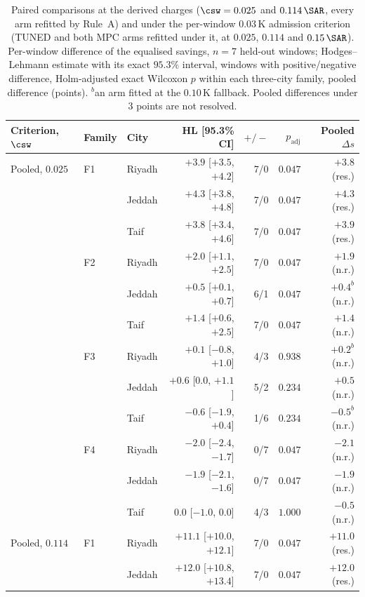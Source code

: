 \begin{table}[!ht]
\centering
\caption{Paired comparisons at the derived charges ($\csw=0.025$ and $0.114\,\SAR$, every arm refitted by Rule~A) and under the per-window $0.03\,$K admission criterion (TUNED and both MPC arms refitted under it, at $0.025$, $0.114$ and $0.15\,\SAR$). Per-window difference of the equalised savings, $n=7$ held-out windows; Hodges--Lehmann estimate with its exact $95.3\%$ interval, windows with positive/negative difference, Holm-adjusted exact Wilcoxon $p$ within each three-city family, pooled difference (points). $^{b}$an arm fitted at the $0.10\,$K fallback. Pooled differences under $3$ points are not resolved.}
\label{tab:s-derived}
\scriptsize
\setlength{\tabcolsep}{3pt}
\begin{tabularx}{\textwidth}{@{}llXrrrr@{}}
\toprule
Criterion, $\csw$ & Family & City & HL [95.3\% CI] & $+/-$ & $p_{\mathrm{adj}}$ & Pooled $\Delta s$ \\
\midrule
Pooled, $0.025$ & F1 & Riyadh & $+3.9$ [$+3.5$, $+4.2$] & 7/0 & $0.047$ & $+3.8$ (res.) \\
 &  & Jeddah & $+4.3$ [$+3.8$, $+4.8$] & 7/0 & $0.047$ & $+4.3$ (res.) \\
 &  & Taif & $+3.8$ [$+3.4$, $+4.6$] & 7/0 & $0.047$ & $+3.9$ (res.) \\
 & F2 & Riyadh & $+2.0$ [$+1.1$, $+2.5$] & 7/0 & $0.047$ & $+1.9$ (n.r.) \\
 &  & Jeddah & $+0.5$ [$+0.1$, $+0.7$] & 6/1 & $0.047$ & $+0.4^{b}$ (n.r.) \\
 &  & Taif & $+1.4$ [$+0.6$, $+2.5$] & 7/0 & $0.047$ & $+1.4$ (n.r.) \\
 & F3 & Riyadh & $+0.1$ [$-0.8$, $+1.0$] & 4/3 & $0.938$ & $+0.2^{b}$ (n.r.) \\
 &  & Jeddah & $+0.6$ [$0.0$, $+1.1$] & 5/2 & $0.234$ & $+0.5$ (n.r.) \\
 &  & Taif & $-0.6$ [$-1.9$, $+0.4$] & 1/6 & $0.234$ & $-0.5^{b}$ (n.r.) \\
 & F4 & Riyadh & $-2.0$ [$-2.4$, $-1.7$] & 0/7 & $0.047$ & $-2.1$ (n.r.) \\
 &  & Jeddah & $-1.9$ [$-2.1$, $-1.6$] & 0/7 & $0.047$ & $-1.9$ (n.r.) \\
 &  & Taif & $0.0$ [$-1.0$, $0.0$] & 4/3 & $1.000$ & $-0.5$ (n.r.) \\
Pooled, $0.114$ & F1 & Riyadh & $+11.1$ [$+10.0$, $+12.1$] & 7/0 & $0.047$ & $+11.0$ (res.) \\
 &  & Jeddah & $+12.0$ [$+10.8$, $+13.4$] & 7/0 & $0.047$ & $+12.0$ (res.) \\

\end{tabularx}
\end{table}
